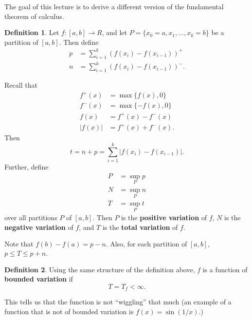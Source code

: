 \documentclass[12pt]{article}
\theoremstyle{definition}
\newtheorem*{definition}{Definition}
\begin{document}
The goal of this lecture is to derive a different version of the fundamental theorem of calculus. 

\begin{definition}
    Let \( f:[a,b] \to R \), and let \( P = \{x_0 = a, x_1, \ldots, x_k = b\} \) be a partition of \( [a,b] \). Then define
        \begin{align*}
            p &= \sum_{i=1}^{k} \left( f(x_i) - f(x_{i-1}) \right)^{+}  \\
            n &= \sum_{i=1}^{k} \left( f(x_i) - f(x_{i-1}) \right)^{-}.
        \end{align*}

Recall that 
    \begin{align*}
        f^{+}(x) &= \max \{ f(x), 0\} \\
        f^{-}(x) &= \max \{ -f(x), 0 \} \\
        f(x) &= f^+(x) - f^-(x) \\
        |f(x)| &= f^+(x) + f^-(x).
    \end{align*}
Then
    \[
        t = n + p =  \sum_{i=1}^{k} |f(x_i) - f(x_{i-1})|.  
    \]
Further, define
    \begin{align*}
        P &= \sup_{P} p \\
        N &= \sup_{P} n \\
        T &=  \sup_{P} t
    \end{align*}
over all partitions \( P \) of \( [a,b] \). Then \( P \) is the \textbf{positive variation} of \( f \), 
\( N \) is the \textbf{negative variation} of \( f \), 
and \( T \) is the \textbf{total variation} of \( f \).
\end{definition}

Note that \( f(b) - f(a)  = p - n \). Also, for each partition of \( [a,b] \), 
\( p \leq T \leq p + n \).

\begin{definition}
    Using the same structure of the definition above, \( f \) is a function of \textbf{bounded variation} if
        \[
            T = T_{f} < \infty.   
        \]
\end{definition}

This tells us that the function is not ``wiggling'' that much (an example of a function that is not of bounded variation is \( f(x) = \sin(1/x). \))
\end{document}
